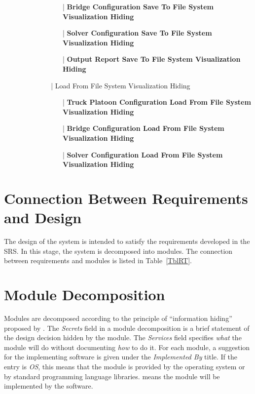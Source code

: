 \documentclass[12pt, titlepage]{article}
\begin{document}
\begin{enumerate}
\begin{enumerate}
\begin{enumerate}
\begin{itemize}
\begin{itemize}
                    \item[|] \textbf{Bridge Configuration Save To File System Visualization Hiding}
                    \item[|] \textbf{Solver Configuration Save To File System Visualization Hiding}
                    \item[|] \textbf{Output Report Save To File System Visualization Hiding}
                \end{itemize}
                \item[|] {Load From File System Visualization Hiding}
                \begin{itemize}
                    \item[|] \textbf{Truck Platoon Configuration Load From File System Visualization Hiding}
                    \item[|] \textbf{Bridge Configuration Load From File System Visualization Hiding}
                    \item[|] \textbf{Solver Configuration Load From File System Visualization Hiding}
                \end{itemize}
            \end{itemize}
        \end{enumerate}
    \end{enumerate}
\end{enumerate}

\section{Connection Between Requirements and Design} \label{SecConnection}

The design of the system is intended to satisfy the requirements developed in
the SRS. In this stage, the system is decomposed into modules. The connection
between requirements and modules is listed in Table~\ref{TblRT}.

\section{Module Decomposition} \label{SecMD}

Modules are decomposed according to the principle of ``information hiding''
proposed by \citet{ParnasEtAl1984}. The \emph{Secrets} field in a module
decomposition is a brief statement of the design decision hidden by the
module. The \emph{Services} field specifies \emph{what} the module will do
without documenting \emph{how} to do it. For each module, a suggestion for the
implementing software is given under the \emph{Implemented By} title. If the
entry is \emph{OS}, this means that the module is provided by the operating
system or by standard programming language libraries.  \emph{\progname{}} means the
module will be implemented by the \progname{} software.
\end{document}
